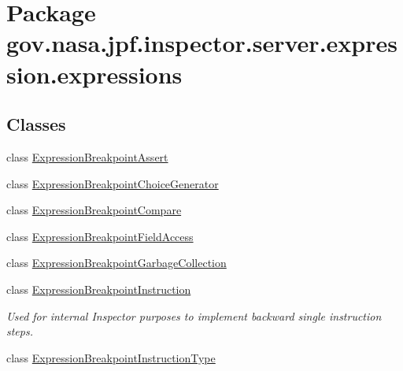 \hypertarget{namespacegov_1_1nasa_1_1jpf_1_1inspector_1_1server_1_1expression_1_1expressions}{}\section{Package gov.\+nasa.\+jpf.\+inspector.\+server.\+expression.\+expressions}
\label{namespacegov_1_1nasa_1_1jpf_1_1inspector_1_1server_1_1expression_1_1expressions}
\subsection*{Classes}
\begin{DoxyCompactItemize}
\item 
class \hyperlink{classgov_1_1nasa_1_1jpf_1_1inspector_1_1server_1_1expression_1_1expressions_1_1_expression_breakpoint_assert}{Expression\+Breakpoint\+Assert}
\item 
class \hyperlink{classgov_1_1nasa_1_1jpf_1_1inspector_1_1server_1_1expression_1_1expressions_1_1_expression_breakpoint_choice_generator}{Expression\+Breakpoint\+Choice\+Generator}
\item 
class \hyperlink{classgov_1_1nasa_1_1jpf_1_1inspector_1_1server_1_1expression_1_1expressions_1_1_expression_breakpoint_compare}{Expression\+Breakpoint\+Compare}
\item 
class \hyperlink{classgov_1_1nasa_1_1jpf_1_1inspector_1_1server_1_1expression_1_1expressions_1_1_expression_breakpoint_field_access}{Expression\+Breakpoint\+Field\+Access}
\item 
class \hyperlink{classgov_1_1nasa_1_1jpf_1_1inspector_1_1server_1_1expression_1_1expressions_1_1_expression_breakpoint_garbage_collection}{Expression\+Breakpoint\+Garbage\+Collection}
\item 
class \hyperlink{classgov_1_1nasa_1_1jpf_1_1inspector_1_1server_1_1expression_1_1expressions_1_1_expression_breakpoint_instruction}{Expression\+Breakpoint\+Instruction}
\begin{DoxyCompactList}\small\item\em Used for internal Inspector purposes to implement backward single instruction steps. \end{DoxyCompactList}\item 
class \hyperlink{classgov_1_1nasa_1_1jpf_1_1inspector_1_1server_1_1expression_1_1expressions_1_1_expression_breakpoint_instruction_type}{Expression\+Breakpoint\+Instruction\+Type}

\end{DoxyCompactItemize}
